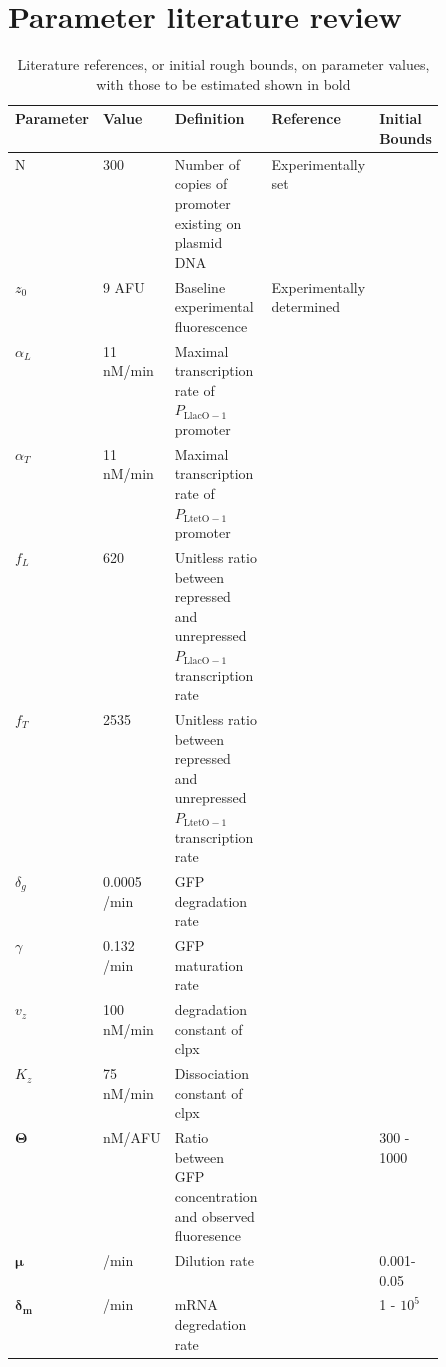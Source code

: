 \documentclass[10pt,journal]{./IEEE_latex_class/IEEEtran}
\begin{document}
\clearpage

\section{Parameter literature review}
\label{Parameter literature review}
\setcounter{figure}{0}    

\begin{table}[h!]
\renewcommand{\arraystretch}{1.3}
\caption{Literature references, or initial rough bounds, on parameter values, with those to be estimated shown in bold}
\centering
\begin{tabular}{| l | l | p{0.3\linewidth} | p{0.1\linewidth} | p{0.1\linewidth} |}
\hline \textbf{Parameter} &  \textbf{Value} & \textbf{Definition} & \textbf{Reference} & \textbf{Initial Bounds}  \\
\hline \hline N & 300 & Number of copies of promoter existing on plasmid DNA & Experimentally set & \\
\hline $z_{0}$ &   9 AFU & Baseline experimental fluorescence & Experimentally determined &  \\
\hline $\alpha_{L}$ & 11 nM/min & Maximal transcription rate of $P_\mathrm{LlacO-1}$ promoter & \cite{Lutz1997} &\\
\hline $\alpha_{T}$  & 11 nM/min  & Maximal transcription rate of $P_{\mathrm{LtetO-1}}$ promoter  & \cite{Lutz1997}& \\
\hline $f_{L}$ & 620 & Unitless ratio between repressed and unrepressed $P_\mathrm{LlacO-1}$ transcription rate  & \cite{Lutz1997}  &  \\ 
\hline $f_{T}$ & 2535 & Unitless ratio between repressed and unrepressed $P_{\mathrm{LtetO-1}}$ transcription rate   & \cite{Lutz1997} &\\
\hline $\delta_{g}$  & 0.0005 /min  & GFP degradation rate & \cite{Andersen1998} &\\
\hline $\gamma$ &  0.132 /min & GFP maturation rate & \cite{Iizuka2011} & \\
\hline $v_{z}$ & 100 nM/min & degradation constant of clpx & \cite{Hersch2004} &\\
\hline $K_{z}$   &   75 nM/min & Dissociation constant of clpx & \cite{Hersch2004} &\\
\hline $\boldsymbol{\Theta}$  &   nM/AFU & Ratio between GFP concentration and observed fluoresence & & 300 - 1000  \\
\hline $\boldsymbol{\mu}$ &  /min & Dilution rate & & 0.001-0.05\\
\hline $\boldsymbol{\delta_{m}}$ &  /min & mRNA degredation rate & & 1 - $10^5$ \\

\end{tabular}
\end{table}
\end{document}
